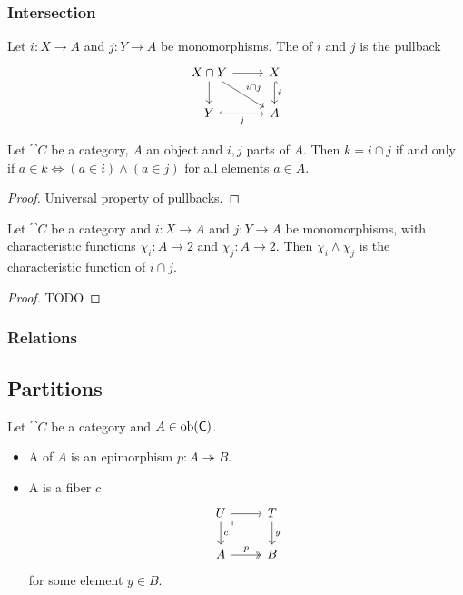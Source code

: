 \subsubsection{Intersection}
\begin{definition}
Let $i: X\to A$ and $j: Y\to A$ be monomorphisms. The  of $i$ and $j$ is the pullback
\[ \begin{tikzcd}
X\cap Y \arrow[r] \arrow[d] \arrow[dr, "i\cap j"] & X \arrow[d, hook, "i"] \\
Y \arrow[r, hook, swap, "j"] & A
\end{tikzcd} \]
\end{definition}

\begin{lemma}
Let $\cat{C}$ be a category, $A$ an object and $i,j$ parts of $A$. Then $k = i\cap j$ \textup{if and only if} $a\in k \iff (a\in i)\land(a\in j)$ for all elements $a\in A$.
\end{lemma}
\begin{proof}
Universal property of pullbacks.
\end{proof}

\begin{proposition}
Let $\cat{C}$ be a category and  $i: X\to A$ and $j: Y\to A$ be monomorphisms, with characteristic functions $\chi_i: A\to 2$ and $\chi_j: A\to 2$. Then $\chi_i \land \chi_j$ is the characteristic function of $i\cap j$.
\end{proposition}
\begin{proof}
TODO
\end{proof}

\subsubsection{Relations}

\subsection{Partitions}
\begin{definition}
Let $\cat{C}$ be a category and $A\in\operatorname{ob}(\mathsf{C})$.
\begin{itemize}
\item A  of $A$ is an epimorphism $p: A \twoheadrightarrow B$.
\item A  is a fiber $c$
\[ \begin{tikzcd}
U \ar[d, "c"]\ar[r] \pbCorner & T \ar[d, "y"] \\
A \ar[r, twoheadrightarrow, "p"] & B
\end{tikzcd} \]
for some element $y\in B$.
\end{itemize}
\end{definition}


